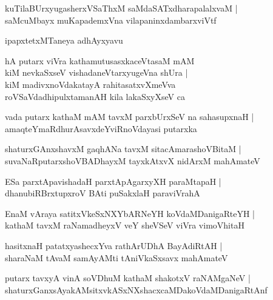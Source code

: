 \documentclass[twoside,12pt,openright]{book}
\newcounter{shloka}[chapter]
\begin{document}
\begin{shloka}%
kuTilaBUrxyugasherxVSaThxM saMdaSATxdharapalalxvaM |\\
saMcuMbayx muKapademxVna vilapaninxdambarxviVtf 
\end{shloka}

\begin{center}
ipapxtetxMTaneya adhAyxyavu
\end{center}

\begin{shloka}%
hA putarx viVra kathamutusasxkaceVtasaM mAM \\
kiM nevkaSxseV vishadaneVtarxyugeVna shUra |\\
kiM madivxnoVdakatayA rahitasatxvXmeVva \\
roVSaVdadhipulxtamanAH kila lakaSxyXseV ca 
\end{shloka}

\begin{shloka}%
vada putarx kathaM mAM tavxM parxbUrxSeV na sahasupxnaH |\\
amaqteYmaRdhurAsavxdeYviRnoVdayasi putarxka
\end{shloka}

\begin{shloka}%
shaturxGAnxshavxM gaqhANa tavxM sitacAmarashoVBitaM |\\
suvaNaRputarxshoVBADhayxM tayxkAtxvX nidArxM mahAmateV 
\end{shloka}

\begin{shloka}%
ESa parxtApavishadaH parxtApAgarxyXH paraMtapaH |\\
dhanubiRBrxtupxroV BAti puSakxlaH paraviVrahA 
\end{shloka}

\begin{shloka}%
EnaM vAraya satitxVkeSxNXYbARNeYH koVdaMDanigaRteYH |\\
kathaM tavxM raNamadheyxV veY sheVSeV viVra vimoVhitaH
\end{shloka}

\begin{shloka}%
hasitxnaH patatxyashecxYva rathArUDhA BayAdiRtAH |\\
sharaNaM tAvaM samAyAMti tAniVkaSxsavx mahAmateV 
\end{shloka}

\begin{shloka}%
putarx tavxyA vinA soVDhuM kathaM shakotxV raNAMgaNeV |\\
shaturxGanxsAyakAMsitxvkASxNXshacxcaMDakoVdaMDanigaRtAnf 
\end{shloka}
\end{document}
